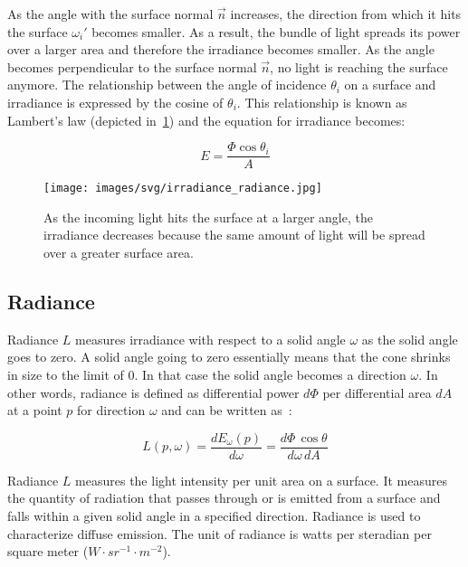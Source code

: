 \documentclass[11pt,a4paper]{report}
\begin{document}
As the angle with the surface normal $\vec{n}$ increases, the direction from which it hits the surface $\omega_i'$ becomes smaller. As a result, the bundle of light spreads its power over a larger area and therefore the irradiance becomes smaller. As the angle becomes perpendicular to the surface normal $\vec{n}$, no light is reaching the surface anymore. The relationship between the angle of incidence $\theta_i$ on a surface and irradiance is expressed by the cosine of $\theta_i$. This relationship is known as Lambert's law (depicted in~\ref{cosine_term_visualization}) and the equation for irradiance becomes:

\begin{equation}
E = \frac{\Phi \cos \theta_i}{A}
\label{eq_irradiance1}
\end{equation}

\begin{figure}
\begin{center}
\texttt{[image: images/svg/irradiance\_radiance.jpg]}
\caption{As the incoming light hits the surface at a larger angle, the irradiance decreases because the same amount of light will be spread over a greater surface area.}
\label{cosine_term_visualization}
\end{center}
\end{figure}


\subsection{Radiance}

Radiance $L$ measures irradiance with respect to a solid angle $\omega$ as the solid angle goes to zero. A solid angle going to zero essentially means that the cone shrinks in size to the limit of 0. In that case the solid angle becomes a direction $\omega$. In other words, radiance is defined as differential power $d\Phi$ per differential area $dA$ at a point $p$ for direction $\omega$ and can be written as~\cite{pharr2017}:

\begin{equation}
L(p, \omega) = \frac{d E_\omega(p)}{d \omega} = \frac{d\Phi\, \cos \theta}{d\omega\, dA}
\end{equation}

Radiance $L$ measures the light intensity per unit area on a surface. It measures the quantity of radiation that passes through or is emitted from a surface and falls within a given solid angle in a specified direction. Radiance is used to characterize diffuse emission. The unit of radiance is watts per steradian per square meter ($W \cdot {sr}^{-1} \cdot m^{-2}$).
\end{document}
